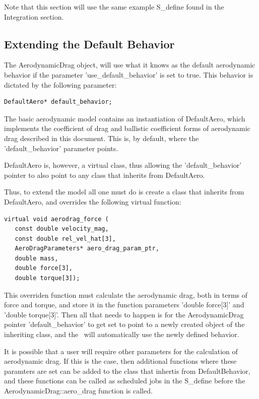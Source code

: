 Note that this section will use the same example S\_define found
in the Integration section.

\subsection{Extending the Default Behavior}

The AerodynamicDrag object, will use what it knows as the default
aerodynamic behavior if the
parameter 'use\_default\_behavior' is set to true. This behavior
is dictated by the following parameter:

\begin{verbatim}
DefaultAero* default_behavior;
\end{verbatim}

The basic aerodynamic model contains an instantiation of DefaultAero,
which implements the coefficient of drag and ballistic coefficient forms
of aerodynamic drag described in this document. This is, by default,
where the 'default\_behavior' parameter points.

DefaultAero is, however, a virtual class, thus allowing the
'default\_behavior' pointer to also point to any class that
inherits from DefaultAero.

Thus, to extend the model all one must do is create a class that
inherits from DefaultAero, and overrides the following virtual function:

\begin{verbatim}
virtual void aerodrag_force (
   const double velocity_mag,
   const double rel_vel_hat[3],
   AeroDragParameters* aero_drag_param_ptr,
   double mass,
   double force[3],
   double torque[3]);
\end{verbatim}

This overriden function must calculate the aerodynamic drag, both
in terms of force and torque, and store it in the function parameters
'double force[3]' and 'double torque[3]'. Then all that needs to happen
is for the AerodynamicDrag pointer 'default\_behavior' to get set
to point to a newly created object of the inheriting class, and
the \aerodynamicsDesc\ will automatically use the newly defined
behavior.

It is possible that a user will require other parameters for the
calculation of aerodynamic drag. If this is the case, then additional
functions where these paramters are set can be added to the class
that inhertis from DefaultBehavior, and these functions can be
called as scheduled jobs in the S\_define before the
AerodynamicDrag::aero\_drag function is called.

